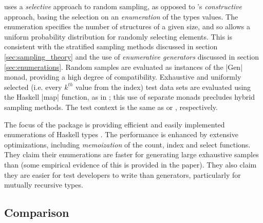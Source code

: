 \FEAT uses a \emph{selective} approach to random sampling,
as opposed to \QC's \emph{constructive} approach,
basing the selection on an \emph{enumeration} of the types values.
The enumeration specifies the number of structures of a given size,
and so allows a uniform probability distribution for
randomly selecting elements.
This is consistent with the stratified sampling methods discussed in section \ref{sec:sampling_theory}
and the use of \emph{enumerative generators} discussed in section \ref{sec:enumerations}.
Random samples are evaluated as instances of the \QC |Gen| monad,
providing a high degree of compatibility.
Exhaustive and uniformly selected (i.e. every $k^{th}$ value from the index) test data sets
are evaluated using the Haskell |map| function, as in \SC;
this use of separate monads precludes hybrid sampling methods.
The test context is the same as \QC or \SC, respectively.

The focus of the \FEAT package is providing efficient 
and easily implemented enumerations of Haskell types .
The performance is enhanced by extensive optimizations,
including \emph{memoization} of the count, index and select functions.
They claim their enumerations are faster for generating large exhaustive samples than \SC
(some empirical evidence of this is provided in the paper).
They also claim they are easier for test developers to write than \QC generators,
particularly for mutually recursive types.


\subsection {Comparison}

